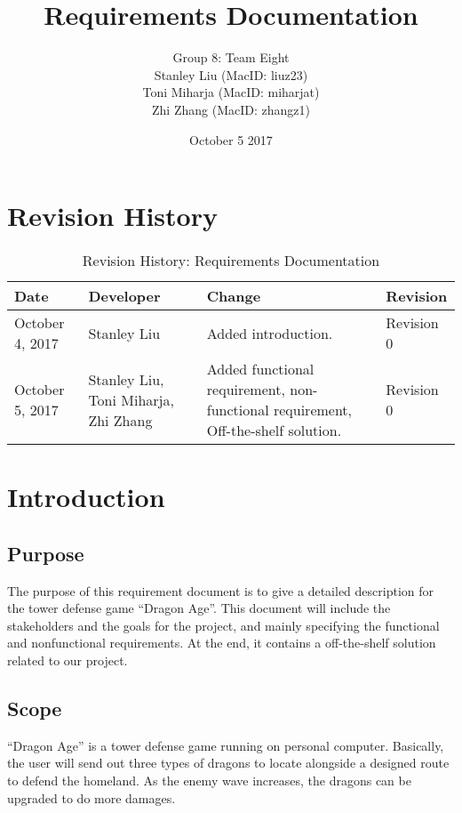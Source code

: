 \documentclass{article}
\title{Requirements Documentation}
\author{Group 8: Team Eight \\
                 Stanley Liu (MacID: liuz23) \\    
                 Toni Miharja (MacID: miharjat)\\
                 Zhi Zhang (MacID: zhangz1)}
\date{October 5 2017 }
\begin{document}
 
\maketitle
\newpage
\tableofcontents
\newpage
 
\section{Revision History}
\begin{table}[h!]
    \centering
    \begin{tabular}{|p{2.5cm}|p{3cm}|p{3cm}|p{2cm}|}
    \hline
    \textbf {Date}  & {Developer} & {Change} & {Revision} \\
    \hline
    October 4, 2017 & Stanley Liu & Added introduction. & Revision 0\\
    \hline
    October 5, 2017  & Stanley Liu, Toni Miharja, Zhi Zhang & Added functional requirement, non-functional requirement, Off-the-shelf solution. & Revision 0\\
    \hline
    \end{tabular}
    \caption{Revision History: Requirements Documentation}
\end{table}
 
\newpage
 
\section{Introduction}

\subsection{Purpose}
The purpose of this requirement document is to give a detailed description for the tower defense game “Dragon Age”. This document will include the stakeholders and the goals for the project, and mainly specifying the functional and nonfunctional requirements. At the end, it contains a off-the-shelf solution related to our project.

\subsection{Scope}
“Dragon Age” is a tower defense game running on personal computer. Basically, the user will send out three types of dragons to locate alongside a designed route to defend the homeland. As the enemy wave increases, the dragons can be upgraded to do more damages.
\end{document}

